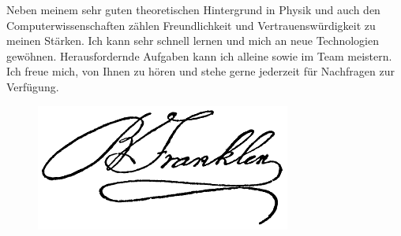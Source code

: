 \documentclass{article}%
\begin{document}
\begin{minipage}{\textwidth}
\newline%
Neben meinem sehr guten theoretischen Hintergrund in Physik und auch den Computerwissenschaften zählen Freundlichkeit und Vertrauenswürdigkeit zu meinen Stärken. Ich kann sehr schnell lernen und mich an neue Technologien gewöhnen. Herausfordernde Aufgaben kann ich alleine sowie im Team meistern.\newline%
Ich freue mich, von Ihnen zu hören und stehe gerne jederzeit für Nachfragen zur Verfügung.%
\vspace*{30mm}%
\end{minipage}%


\begin{figure}[ht]%
\raggedleft%
\includegraphics[width=0.2\linewidth]{images/signature.png}%
\end{figure}

%
\end{document}
